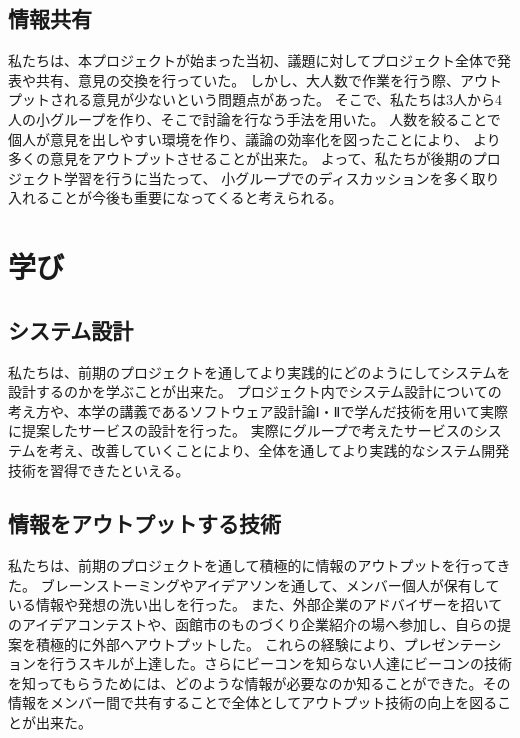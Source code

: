 \documentclass[openany,11pt,papersize]{jsbook}
\begin{document}
\subsection{情報共有}
私たちは、本プロジェクトが始まった当初、議題に対してプロジェクト全体で発表や共有、意見の交換を行っていた。
しかし、大人数で作業を行う際、アウトプットされる意見が少ないという問題点があった。
そこで、私たちは3人から4人の小グループを作り、そこで討論を行なう手法を用いた。
人数を絞ることで個人が意見を出しやすい環境を作り、議論の効率化を図ったことにより、
より多くの意見をアウトプットさせることが出来た。
よって、私たちが後期のプロジェクト学習を行うに当たって、
小グループでのディスカッションを多く取り入れることが今後も重要になってくると考えられる。

\section{学び}

\subsection{システム設計}
私たちは、前期のプロジェクトを通してより実践的にどのようにしてシステムを設計するのかを学ぶことが出来た。
プロジェクト内でシステム設計についての考え方や、本学の講義であるソフトウェア設計論Ⅰ・Ⅱで学んだ技術を用いて実際に提案したサービスの設計を行った。
実際にグループで考えたサービスのシステムを考え、改善していくことにより、全体を通してより実践的なシステム開発技術を習得できたといえる。

\subsection{情報をアウトプットする技術}
 私たちは、前期のプロジェクトを通して積極的に情報のアウトプットを行ってきた。
ブレーンストーミングやアイデアソンを通して、メンバー個人が保有している情報や発想の洗い出しを行った。
また、外部企業のアドバイザーを招いてのアイデアコンテストや、函館市のものづくり企業紹介の場へ参加し、自らの提案を積極的に外部へアウトプットした。
これらの経験により、プレゼンテーションを行うスキルが上達した。さらにビーコンを知らない人達にビーコンの技術を知ってもらうためには、どのような情報が必要なのか知ることができた。その情報をメンバー間で共有することで全体としてアウトプット技術の向上を図ることが出来た。 
\end{document}
